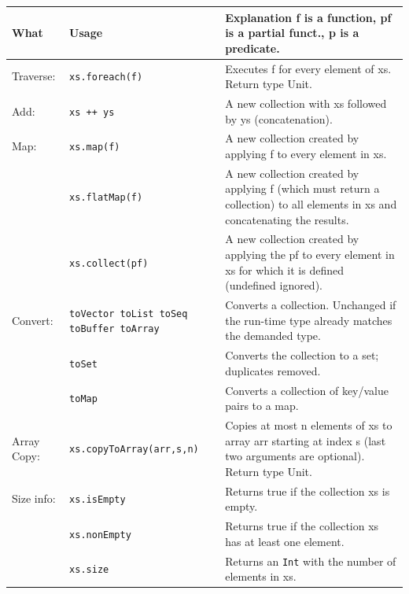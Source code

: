 \documentclass[article, a5paper]{memoir}
\renewcommand{\arraystretch}{0.9}
\begin{document}
{\small\renewcommand{\arraystretch}{1.16}
\begin{tabular}{@{}l p{3.6cm} p{6.8cm}}
\textbf{What} & \textbf{Usage} & \textbf{Explanation} f is a function, pf is a partial funct., p is a predicate.\\ \hline
Traverse: & \texttt{xs.foreach(f)} & Executes f for every element of xs. Return type Unit.\\ \cline{1-3}

  Add: & \texttt{xs ++ ys} & A new collection with xs followed by ys (concatenation).\\\cline{1-3}

  Map:     
      & \texttt{xs.map(f)} & A new collection created by applying f to every element in xs.\\ \cline{2-3}
      & \texttt{xs.flatMap(f)} & A new collection created by applying f (which must return a collection) to all elements in xs and concatenating the results.\\ \cline{2-3}
       & \texttt{xs.collect(pf)} & A new collection created by applying the pf to every element in xs for which it is defined (undefined ignored).\\ \cline{1-3}

  Convert: & \texttt{toVector toList toSeq toBuffer toArray} & Converts a collection. Unchanged if the run-time type already matches the demanded type.\\ \cline{2-3}
   & \texttt{toSet} & Converts the collection to a set; duplicates removed.\\ \cline{2-3}
   & \texttt{toMap} & Converts a collection of key/value pairs to a map. \\ \cline{1-3}

   Array Copy:  & \texttt{xs.copyToArray(arr,s,n)} & Copies at most n elements of xs to array arr starting at index s (last two arguments are optional). Return type Unit.\\ \cline{1-3}

  Size info: & \texttt{xs.isEmpty} & Returns true if the collection xs is empty.\\ \cline{2-3}
   & \texttt{xs.nonEmpty} & Returns true if the collection xs has at least one element.\\ \cline{2-3}
   & \texttt{xs.size} & Returns an \texttt{Int} with the number of elements in xs.\\ \cline{1-3}



\end{tabular}}
\end{document}

